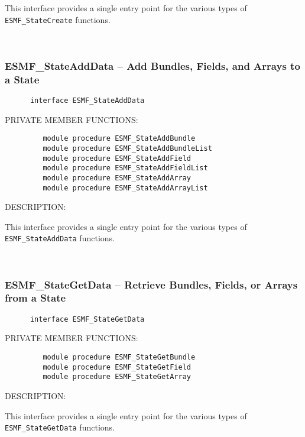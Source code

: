  
   This interface provides a single entry point for the various 
    types of {\tt ESMF\_StateCreate} functions.   
     
 
\mbox{}\hrulefill\ 
 
\subsubsection{ESMF\_StateAddData -- Add Bundles, Fields, and Arrays to a State}


 
\begin{verbatim}      interface ESMF_StateAddData
 \end{verbatim}{\sf PRIVATE MEMBER FUNCTIONS:}
\begin{verbatim}         module procedure ESMF_StateAddBundle
         module procedure ESMF_StateAddBundleList
         module procedure ESMF_StateAddField
         module procedure ESMF_StateAddFieldList
         module procedure ESMF_StateAddArray
         module procedure ESMF_StateAddArrayList
 \end{verbatim}
{\sf DESCRIPTION:\\ }

 
   This interface provides a single entry point for the various 
    types of {\tt ESMF\_StateAddData} functions.   
     
 
\mbox{}\hrulefill\ 
 
\subsubsection{ESMF\_StateGetData -- Retrieve Bundles, Fields, or Arrays from a State}


 
\begin{verbatim}      interface ESMF_StateGetData
 \end{verbatim}{\sf PRIVATE MEMBER FUNCTIONS:}
\begin{verbatim}         module procedure ESMF_StateGetBundle
         module procedure ESMF_StateGetField
         module procedure ESMF_StateGetArray
 \end{verbatim}
{\sf DESCRIPTION:\\ }

 
   This interface provides a single entry point for the various 
    types of {\tt ESMF\_StateGetData} functions.   
     
